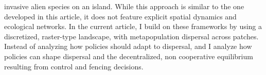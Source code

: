 invasive alien species on an island. While this approach is similar to the one developed in this article, it does not feature explicit spatial dynamics and ecological networks. 
In the current article, I build on these frameworks by using a discretized, raster-type landscape, with metapopulation dispersal across patches. Instead of analyzing how policies should adapt to dispersal, and I analyze how policies can shape dispersal and the decentralized, non cooperative equilibrium resulting from control and fencing decisions. 


